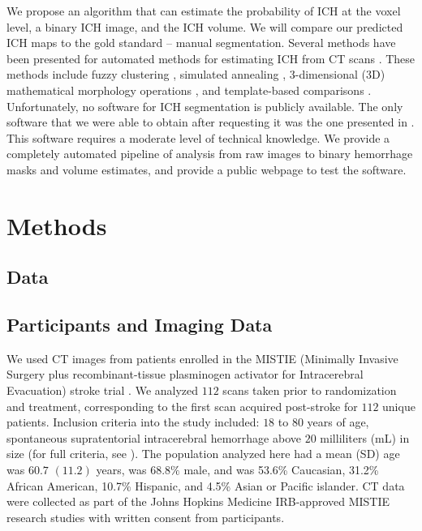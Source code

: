 \documentclass{elsarticle_nonatbib}\usepackage[]{graphicx}\usepackage[]{color}
\begin{document}
We propose an algorithm that can estimate the probability of ICH at the voxel level, a binary ICH image, and the ICH volume.  We will compare our predicted ICH maps to the gold standard -- manual segmentation.  Several methods have been presented for automated methods for estimating ICH from CT scans \citep{ gillebert_automated_2014, prakash_segmentation_2012, loncaric_hierarchical_1996, loncaric_quantitative_1999, perez_set_2007}.  These methods include fuzzy clustering \citep{prakash_segmentation_2012, loncaric_hierarchical_1996}, simulated annealing \citep{loncaric_quantitative_1999}, 3-dimensional (3D) mathematical morphology operations \citep{perez_set_2007}, and template-based comparisons \citep{gillebert_automated_2014}.  Unfortunately, no software for ICH segmentation is publicly available.   The only software that we were able to obtain after requesting it was the one presented in \citet{gillebert_automated_2014}. This software requires a moderate level of technical knowledge.  We provide a completely automated pipeline of analysis from raw images to binary hemorrhage masks and volume estimates, and provide a public webpage to test the software. 

\section{Methods}

\subsection{Data} 
\subsection{ Participants and Imaging Data }
We used CT images from patients enrolled in the MISTIE (Minimally Invasive Surgery plus recombinant-tissue plasminogen activator for Intracerebral Evacuation) stroke trial \citep{morgan_preliminary_2008_mistie}. We analyzed $112$ scans taken prior to randomization and treatment, corresponding to the first scan acquired post-stroke for $112$ unique patients.  Inclusion criteria into the study included: $18$ to $80$ years of age, spontaneous supratentorial intracerebral hemorrhage above $20$ milliliters (mL) in size (for full criteria, see \citet{mould_minimally_2013}).  The population analyzed here had a mean (SD) age was $60.7$ $(11.2)$ years, was $68.8\%$ male, and was 53.6\% Caucasian, 31.2\% African American, 10.7\% Hispanic, and 4.5\% Asian or Pacific islander.  CT data were collected as part of the Johns Hopkins Medicine IRB-approved MISTIE research studies with written consent from participants.  
\end{document}
